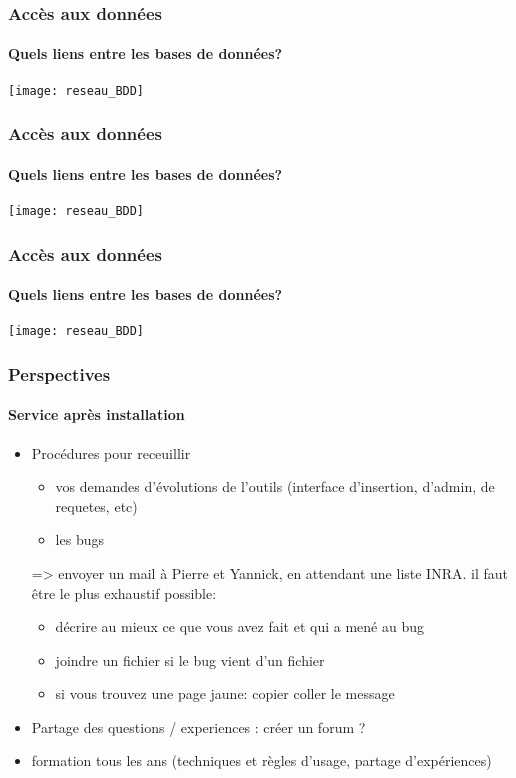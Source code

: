 \begin{frame}
\frametitle{Accès aux données}
\framesubtitle{Quels liens entre les bases de données?}

\begin{center}
\texttt{[image: reseau\_BDD]}
\end{center}

\end{frame}


\begin{frame}
\frametitle{Accès aux données}
\framesubtitle{Quels liens entre les bases de données?}

\begin{center}
\texttt{[image: reseau\_BDD]}
\end{center}

\end{frame}

\begin{frame}
\frametitle{Accès aux données}
\framesubtitle{Quels liens entre les bases de données?}

\begin{center}
\texttt{[image: reseau\_BDD]}
\end{center}

\end{frame}


\begin{frame}
\frametitle{Perspectives}
\framesubtitle{Service après installation}

\begin{itemize}
\item Procédures pour receuillir

\begin{itemize}
\item vos demandes d'évolutions de l'outils (interface d'insertion, d'admin, de requetes, etc)
\item les bugs
\end{itemize}

\begin{block}{}
=> envoyer un mail à Pierre et Yannick, en attendant une liste INRA.
il faut être le plus exhaustif possible:
\begin{itemize}
\item décrire au mieux ce que vous avez fait et qui a mené au bug
\item joindre un fichier si le bug vient d'un fichier
\item si vous trouvez une page jaune: copier coller le message
\end{itemize}
\end{block}

\item Partage des questions / experiences : créer un forum ?

\item formation tous les ans (techniques et règles d'usage, partage d'expériences)

\end{itemize}

\end{frame}


